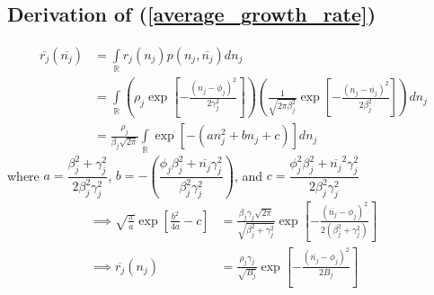 \documentclass{amsart}
\theoremstyle{definition}
\theoremstyle{remark}
\numberwithin{equation}{section}
\begin{document}
\subsection*{Derivation of (\ref{average_growth_rate})}
\begin{align*}
	\overline{r_j}(\overline{n_j}) &= \int\limits_{\mathbb{R}}^{}r_j(n_j)p(n_j, \overline{n_j})dn_j \\
	&= \int\limits_{\mathbb{R}}\left(\rho_j\exp\left[-\frac{(n_j - \phi_j)^2}{2\gamma_j^2}\right]\right)\left(\frac{1}{\sqrt{2\pi\beta_j^2}}\exp\left[-\frac{(n_j - \overline{n_j})^2}{2\beta_j^2}\right]\right)dn_j \\
	&= \frac{\rho_j}{\beta_j\sqrt{2\pi}}\int\limits_{\mathbb{R}}\exp\left[-(an_j^2 + bn_j + c)\right]dn_j
\end{align*}
where $a = \dfrac{\beta_j^2 + \gamma_j^2}{2\beta_j^2\gamma_j^2}$, $b = -\left(\dfrac{\phi_j\beta_j^2 + \overline{n_j}\gamma_j^2}{\beta_j^2\gamma_j^2}\right)$, and $c = \dfrac{\phi_j^2\beta_j^2 + \overline{n_j}^2\gamma_j^2}{2\beta_j^2\gamma_j^2}$
\begin{align*}
	\implies \sqrt{\frac{\pi}{a}}\exp\left[\frac{b^2}{4a} - c\right] &= \frac{\beta_j\gamma_j\sqrt{2\pi}}{\sqrt{\beta_j^2 + \gamma_j^2}}\exp\left[-\frac{(\overline{n_j} - \phi_j)^2}{2(\beta_j^2 + \gamma_j^2)}\right] \\
	\implies \overline{r_j}(n_j) &= \frac{\rho_j\gamma_j}{\sqrt{B_j}}\exp\left[-\frac{(\overline{n_j} - \phi_j)^2}{2B_j}\right]
\end{align*}
\end{document}
